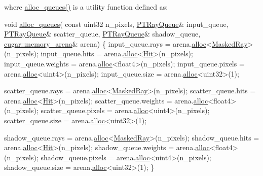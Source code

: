 \begin{DoxyParagraph}{}
where \hyperlink{group___p_t_lib_gaf8daef8b815f7712ff692edbaa628881}{alloc\+\_\+queues()} is a utility function defined as\+: ~\newline
 
\begin{DoxyCodeInclude}
\textcolor{keywordtype}{void} \hyperlink{group___p_t_lib_gaf8daef8b815f7712ff692edbaa628881}{alloc\_queues}(
    \textcolor{keyword}{const} uint32            n\_pixels,
    \hyperlink{struct_p_t_ray_queue}{PTRayQueue}&               input\_queue,
    \hyperlink{struct_p_t_ray_queue}{PTRayQueue}&               scatter\_queue,
    \hyperlink{struct_p_t_ray_queue}{PTRayQueue}&               shadow\_queue,
    \hyperlink{structcugar_1_1memory__arena}{cugar::memory\_arena}& arena)
\{   
    input\_queue.rays        = arena.\hyperlink{structcugar_1_1memory__arena_afcbc6673ae3fa3e61368495ed2041621}{alloc}<\hyperlink{struct_masked_ray}{MaskedRay}>(n\_pixels);
    input\_queue.hits        = arena.\hyperlink{structcugar_1_1memory__arena_afcbc6673ae3fa3e61368495ed2041621}{alloc}<\hyperlink{struct_hit}{Hit}>(n\_pixels);
    input\_queue.weights     = arena.\hyperlink{structcugar_1_1memory__arena_afcbc6673ae3fa3e61368495ed2041621}{alloc}<float4>(n\_pixels);
    input\_queue.pixels      = arena.\hyperlink{structcugar_1_1memory__arena_afcbc6673ae3fa3e61368495ed2041621}{alloc}<uint4>(n\_pixels);
    input\_queue.size        = arena.\hyperlink{structcugar_1_1memory__arena_afcbc6673ae3fa3e61368495ed2041621}{alloc}<uint32>(1);

    scatter\_queue.rays      = arena.\hyperlink{structcugar_1_1memory__arena_afcbc6673ae3fa3e61368495ed2041621}{alloc}<\hyperlink{struct_masked_ray}{MaskedRay}>(n\_pixels);
    scatter\_queue.hits      = arena.\hyperlink{structcugar_1_1memory__arena_afcbc6673ae3fa3e61368495ed2041621}{alloc}<\hyperlink{struct_hit}{Hit}>(n\_pixels);
    scatter\_queue.weights   = arena.\hyperlink{structcugar_1_1memory__arena_afcbc6673ae3fa3e61368495ed2041621}{alloc}<float4>(n\_pixels);
    scatter\_queue.pixels    = arena.\hyperlink{structcugar_1_1memory__arena_afcbc6673ae3fa3e61368495ed2041621}{alloc}<uint4>(n\_pixels);
    scatter\_queue.size      = arena.\hyperlink{structcugar_1_1memory__arena_afcbc6673ae3fa3e61368495ed2041621}{alloc}<uint32>(1);

    shadow\_queue.rays       = arena.\hyperlink{structcugar_1_1memory__arena_afcbc6673ae3fa3e61368495ed2041621}{alloc}<\hyperlink{struct_masked_ray}{MaskedRay}>(n\_pixels);
    shadow\_queue.hits       = arena.\hyperlink{structcugar_1_1memory__arena_afcbc6673ae3fa3e61368495ed2041621}{alloc}<\hyperlink{struct_hit}{Hit}>(n\_pixels);
    shadow\_queue.weights    = arena.\hyperlink{structcugar_1_1memory__arena_afcbc6673ae3fa3e61368495ed2041621}{alloc}<float4>(n\_pixels);
    shadow\_queue.pixels     = arena.\hyperlink{structcugar_1_1memory__arena_afcbc6673ae3fa3e61368495ed2041621}{alloc}<uint4>(n\_pixels);
    shadow\_queue.size       = arena.\hyperlink{structcugar_1_1memory__arena_afcbc6673ae3fa3e61368495ed2041621}{alloc}<uint32>(1);
\}
\end{DoxyCodeInclude}
 
\end{DoxyParagraph}
